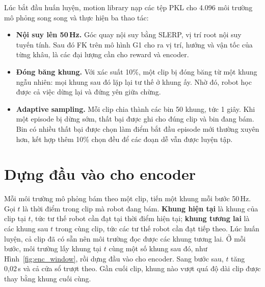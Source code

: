 \documentclass[12pt,a4paper,oneside]{report}
\begin{document}
Lúc bắt đầu huấn luyện, motion library nạp các tệp PKL cho 4.096 môi trường mô phỏng song song và thực hiện ba thao tác:
\begin{itemize}
\item \textbf{Nội suy lên 50\,Hz.} Góc quay nội suy bằng SLERP, vị trí root nội suy tuyến tính. Sau đó FK trên mô hình G1 cho ra vị trí, hướng và vận tốc của từng khâu, là các đại lượng cần cho reward và encoder.
\item \textbf{Đóng băng khung.} Với xác suất 10\%, một clip bị đóng băng từ một khung ngẫu nhiên: mọi khung sau đó lặp lại tư thế ở khung ấy. Nhờ đó, robot học được cả việc dừng lại và đứng yên giữa chừng.
\item \textbf{Adaptive sampling.} Mỗi clip chia thành các bin 50 khung, tức 1 giây. Khi một episode bị dừng sớm, thất bại được ghi cho đúng clip và bin đang bám. Bin có nhiều thất bại được chọn làm điểm bắt đầu episode mới thường xuyên hơn, kết hợp thêm 10\% chọn đều để các đoạn dễ vẫn được luyện tập.
\end{itemize}

\section{Dựng đầu vào cho encoder}
\label{sec:encoder_input}

Mỗi môi trường mô phỏng bám theo một clip, tiến một khung mỗi bước 50\,Hz. Gọi $t$ là thời điểm trong clip mà robot đang bám. \textbf{Khung hiện tại} là khung của clip tại $t$, tức tư thế robot cần đạt tại thời điểm hiện tại; \textbf{khung tương lai} là các khung sau $t$ trong cùng clip, tức các tư thế robot cần đạt tiếp theo. Lúc huấn luyện, cả clip đã có sẵn nên môi trường đọc được các khung tương lai. Ở mỗi bước, môi trường lấy khung tại $t$ cùng một số khung sau đó, như Hình~\ref{fig:enc_window}, rồi dựng đầu vào cho encoder. Sang bước sau, $t$ tăng 0,02\,s và cả cửa sổ trượt theo. Gần cuối clip, khung nào vượt quá độ dài clip được thay bằng khung cuối cùng.
\end{document}
